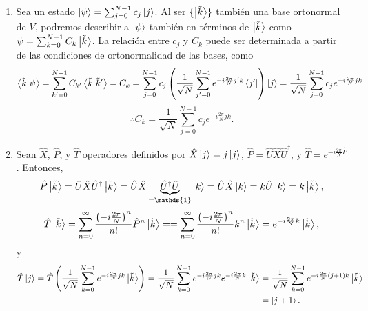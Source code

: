 \documentclass{scrartcl}
\newcommand{\inv}[1]{\frac{1}{#1}}
\DeclareRobustCommand{\[}{\begin{equation}}
\DeclareRobustCommand{\]}{\end{equation}}
\begin{document}
\begin{enumerate}
\begin{enumerate}
        
        \item Sea un estado $\ket{\psi} = \sum_{j = 0}^{N - 1} c_j \ket{j}$. Al ser $\{ \ket{\tilde{k}} \}$ también una base ortonormal de $V$, podremos describir a $\ket{\psi}$ también en términos de $\ket{\tilde{k}}$ como $\psi = \sum_{k = 0}^{N - 1} C_k \ket{\tilde{k}}$. La relación entre $c_j$ y $C_k$ puede ser determinada a partir de las condiciones de ortonormalidad de las bases, como
        \[ \ip{\tilde{k}}{\psi} = \sum_{k' = 0}^{N - 1} C_{k'} \ip{\tilde{k}}{\tilde{k}'} = C_k = \sum_{j = 0}^{N - 1} c_j \left( \inv{\sqrt{N}} \sum_{j' = 0}^{N - 1} e^{-i \frac{2\pi}{N} j' k} \bra{j'}\right) \ket{j} = \inv{\sqrt{N}} \sum_{j = 0}^{N - 1} c_j e^{-i \frac{2\pi}{N} j k} \]
        \[ \therefore C_k = \inv{\sqrt{N}} \sum_{j = 0}^{N - 1} c_j e^{-i \frac{2\pi}{N} j k}. \]
        
        
        \item Sean $\hat X$, $\hat P$, y $\hat T$ operadores definidos por $\hat X \ket{j} = j \ket{j}$, $\hat P = \hat U \hat X \hat U^\dagger$, y $\hat T = e^{-i \frac{2\pi}{N} \hat P}$. Entonces,
        \[ \hat P \ket{\tilde{k}} = \hat U \hat X \hat U^\dagger \ket{\tilde{k}} = \hat U \hat X \underbrace{\hat U^\dagger \hat U}_{= \mathds{1}} \ket{k} = \hat U \hat X \ket{k} = k \hat U \ket{k} = k \ket{\tilde{k}}, \]
        \[ \hat T \ket{\tilde{k}} = \sum_{n = 0}^\infty \frac{\qty(-i \frac{2\pi}{N})^n}{n!} \hat P^n \ket{\tilde{k}} = = \sum_{n = 0}^\infty \frac{\qty(-i \frac{2\pi}{N})^n}{n!} k^n \ket{\tilde{k}} = e^{-i \frac{2\pi}{N} k} \ket{\tilde{k}}, \]
        y
        \begin{align}
            \hat T \ket{j} = \hat T \left( \inv{\sqrt{N}} \sum_{k = 0}^{N - 1} e^{-i \frac{2\pi}{N} jk} \ket{\tilde{k}} \right) = \inv{\sqrt{N}} \sum_{k = 0}^{N - 1} e^{-i \frac{2\pi}{N} jk} e^{-i \frac{2\pi}{N} k} \ket{\tilde{k}} &= \inv{\sqrt{N}} \sum_{k = 0}^{N - 1} e^{-i \frac{2\pi}{N} (j + 1)k} \ket{\tilde{k}} \\
                &= \ket{j + 1}.
        \end{align}
        
    \end{enumerate}
    
    
    

\end{enumerate}
\end{document}
